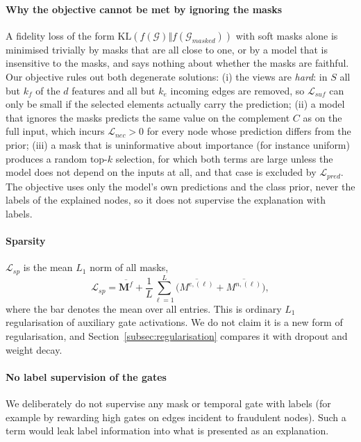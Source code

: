 \paragraph{Why the objective cannot be met by ignoring the masks} A fidelity loss of the form $\mathrm{KL}(f(\mathcal{G})\Vert f(\mathcal{G}_{masked}))$ with soft masks alone is minimised trivially by masks that are all close to one, or by a model that is insensitive to the masks, and says nothing about whether the masks are faithful. Our objective rules out both degenerate solutions:
(i) the views are \emph{hard}: in $S$ all but $k_f$ of the $d$ features and all but $k_e$ incoming edges are removed, so $\mathcal{L}_{suf}$ can only be small if the selected elements actually carry the prediction;
(ii) a model that ignores the masks predicts the same value on the complement $C$ as on the full input, which incurs $\mathcal{L}_{nec}>0$ for every node whose prediction differs from the prior;
(iii) a mask that is uninformative about importance (for instance uniform) produces a random top-$k$ selection, for which both terms are large unless the model does not depend on the inputs at all, and that case is excluded by $\mathcal{L}_{pred}$.
The objective uses only the model's own predictions and the class prior, never the labels of the explained nodes, so it does not supervise the explanation with labels.

\paragraph{Sparsity} $\mathcal{L}_{sp}$ is the mean $L_1$ norm of all masks,
\begin{equation}
\mathcal{L}_{sp}=\overline{\mathbf{M}^{f}}+\frac{1}{L}\sum_{\ell=1}^{L}\big(\overline{M^{e,(\ell)}}+\overline{M^{n,(\ell)}}\big),
\label{eq:sparse}
\end{equation}
where the bar denotes the mean over all entries. This is ordinary $L_1$ regularisation of auxiliary gate activations. We do not claim it is a new form of regularisation, and Section~\ref{subsec:regularisation} compares it with dropout and weight decay.

\paragraph{No label supervision of the gates} We deliberately do not supervise any mask or temporal gate with labels (for example by rewarding high gates on edges incident to fraudulent nodes). Such a term would leak label information into what is presented as an explanation.

